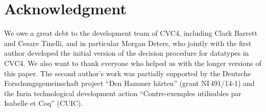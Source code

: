 \documentclass[letter]{article}
\theoremstyle{plain}
\theoremstyle{definition}
\begin{document}
\section*{Acknowledgment}

We owe a great debt to the development team of CVC4, including Clark Barrett
and Cesare Tinelli, and in particular Morgan Deters, who jointly with the
first author developed the initial version of the decision procedure for
datatypes in CVC4.
We also want to thank everyone who helped us with the longer versions of
this paper.
The second author's work was partially supported by
the Deutsche
Forschungs\-gemein\-schaft %
project ``Den Hammer h\"arten'' (grant NI\,491\slash 14-1)
and the Inria technological development
action ``Contre-exemples utilisables par Isabelle et Coq'' (CUIC).

\raggedright


{}


\vfill

~
\end{document}
